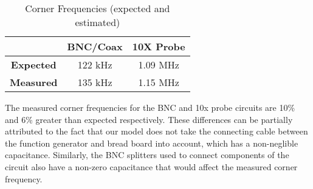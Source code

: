 \documentclass[12pt,letterpaper]{report}
\begin{document}
\begin{center}
\begin{table}[ht]
\caption{Corner Frequencies (expected and estimated)}
\centering 
	\begin{tabular}{| c | c | c |}
	\hline
	& \textbf{BNC/Coax} & \textbf{10X Probe} \\
	\hline
	\textbf{Expected} & 122 kHz & 1.09 MHz \\
	\textbf{Measured} & 135 kHz & 1.15 MHz \\
	\hline
	\end{tabular}
	\label{table:corners}
\end{table}
\end{center}

The measured corner frequencies for the BNC and 10x probe circuits are 10\% and 6\% greater than expected respectively. These differences can be partially attributed to the fact that our model does not take the connecting cable between the function generator and bread board into account, which has a non-neglible capacitance. Similarly, the BNC splitters used to connect components of the circuit also have a non-zero capacitance that would affect the measured corner frequency.
\end{document}
